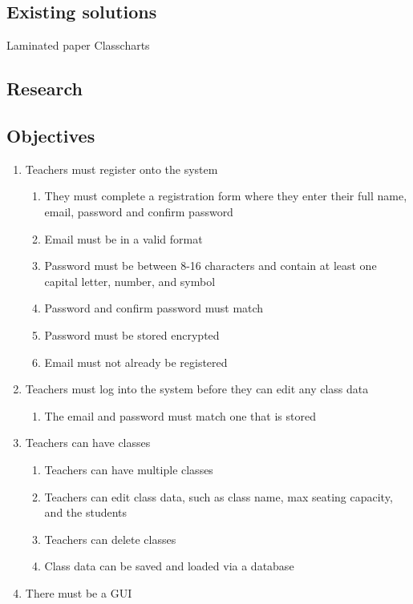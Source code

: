 \documentclass{article}
\begin{document}
\subsection{Existing solutions}
Laminated paper
Classcharts
\subsection{Research}

\subsection{Objectives}
\begin{enumerate}
    \item Teachers must register onto the system 
    \begin{enumerate}
        \item They must complete a registration form where they enter their full name, email, password and confirm password 
        \item Email must be in a valid format
        \item Password must be between 8-16 characters and contain at least one capital letter, number, and symbol
        \item Password and confirm password must match 
        \item Password must be stored encrypted
        \item Email must not already be registered 
    \end{enumerate}
    \item Teachers must log into the system before they can edit any class data
    \begin{enumerate}
        \item The email and password must match one that is stored 
    \end{enumerate}
    \item Teachers can have classes
    \begin{enumerate}
        \item Teachers can have multiple classes
        \item Teachers can edit class data, such as class name, max seating capacity, and the students
        \item Teachers can delete classes
        \item Class data can be saved and loaded via a database
    \end{enumerate}
    \item There must be a GUI

\end{enumerate}
\end{document}
